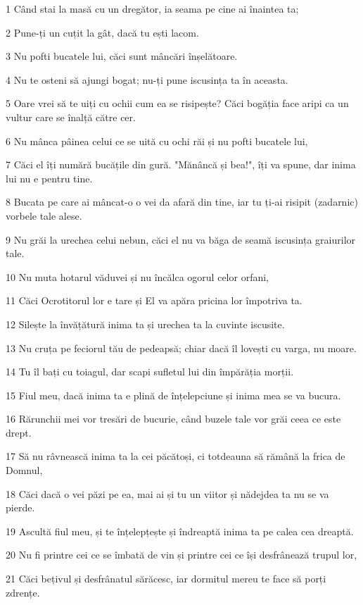\par 1 Când stai la masă cu un dregător, ia seama pe cine ai înaintea ta;
\par 2 Pune-ți un cuțit la gât, dacă tu ești lacom.
\par 3 Nu pofti bucatele lui, căci sunt mâncări înșelătoare.
\par 4 Nu te osteni să ajungi bogat; nu-ți pune iscusința ta în aceasta.
\par 5 Oare vrei să te uiți cu ochii cum ea se risipește? Căci bogăția face aripi ca un vultur care se înalță către cer.
\par 6 Nu mânca pâinea celui ce se uită cu ochi răi și nu pofti bucatele lui,
\par 7 Căci el îți numără bucățile din gură. "Mănâncă și bea!", îți va spune, dar inima lui nu e pentru tine.
\par 8 Bucata pe care ai mâncat-o o vei da afară din tine, iar tu ți-ai risipit (zadarnic) vorbele tale alese.
\par 9 Nu grăi la urechea celui nebun, căci el nu va băga de seamă iscusința graiurilor tale.
\par 10 Nu muta hotarul văduvei și nu încălca ogorul celor orfani,
\par 11 Căci Ocrotitorul lor e tare și El va apăra pricina lor împotriva ta.
\par 12 Silește la învățătură inima ta și urechea ta la cuvinte iscusite.
\par 13 Nu cruța pe feciorul tău de pedeapsă; chiar dacă îl lovești cu varga, nu moare.
\par 14 Tu îl bați cu toiagul, dar scapi sufletul lui din împărăția morții.
\par 15 Fiul meu, dacă inima ta e plină de înțelepciune și inima mea se va bucura.
\par 16 Rărunchii mei vor tresări de bucurie, când buzele tale vor grăi ceea ce este drept.
\par 17 Să nu râvnească inima ta la cei păcătoși, ci totdeauna să rămână la frica de Domnul,
\par 18 Căci dacă o vei păzi pe ea, mai ai și tu un viitor și nădejdea ta nu se va pierde.
\par 19 Ascultă fiul meu, și te înțelepțește și îndreaptă inima ta pe calea cea dreaptă.
\par 20 Nu fi printre cei ce se îmbată de vin și printre cei ce își desfrânează trupul lor,
\par 21 Căci bețivul și desfrânatul sărăcesc, iar dormitul mereu te face să porți zdrențe.
